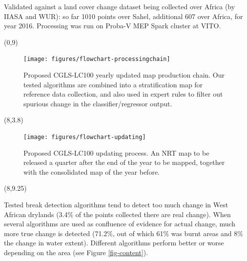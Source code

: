 \documentclass[20pt]{beamer}
\begin{document}
\begin{frame}{}
\begin{textblock}{7}
        Validated against a land cover change dataset being collected over Africa (by IIASA and WUR): so far 1010 points over Sahel, additional 607 over Africa, for year 2016. Processing was run on Proba-V MEP Spark cluster at VITO.
    
	  
	\end{textblock}
	
	\begin{textblock}{7}(0,9)
        \begin{figure}
 			\texttt{[image: figures/flowchart-processingchain]}
 			\caption{Proposed CGLS-LC100 yearly updated map production chain. Our tested algorithms are combined into a stratification map for reference data collection, and also used in expert rules to filter out spurious change in the classifier/regressor output.}
 			\label{fig-processingchain}
       \end{figure}
	\end{textblock}	
	
	\begin{textblock}{7}(8,3.8)
        \begin{figure}
 			\texttt{[image: figures/flowchart-updating]}
 			\caption{Proposed CGLS-LC100 updating process. An NRT map to be released a quarter after the end of the year to be mapped, together with the consolidated map of the year before.}
 			\label{fig-updating}
       \end{figure}
	\end{textblock}	
	
	\begin{textblock}{7}(8,9.25)
		\Line
		
            
            Tested break detection algorithms tend to detect too much change in West African drylands (3.4\% of the points collected there are real change). When several algorithms are used as confluence of evidence for actual change, much more true change is detected (71.2\%, out of which 61\% was burnt areas and 8\% the change in water extent). Different algorithms perform better or worse depending on the area (see Figure \ref{fig-content}).
            

\end{textblock}
\end{frame}
\end{document}
